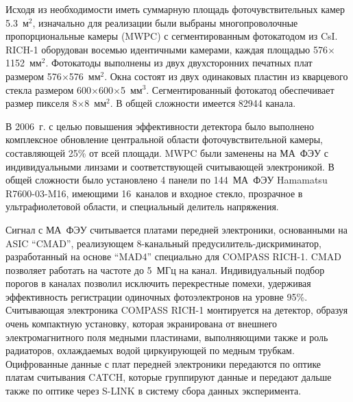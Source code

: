 
Исходя из необходимости иметь суммарную площадь фоточувствительных камер 5.3~м$^2$, изначально для реализации были выбраны многопроволочные пропорциональные камеры (MWPC) с сегментированным фотокатодом из CsI. \mbox{RICH-1} оборудован восемью идентичными камерами, каждая площадью 576$\times$1152~мм$^2$. Фотокатоды выполнены из двух двухсторонних печатных плат размером 576$\times$576~мм$^2$. Окна состоят из двух одинаковых пластин из кварцевого стекла размером 600$\times$600$\times$5~мм$^3$. Сегментированный фотокатод обеспечивает размер пикселя 8$\times$8~мм$^2$. В общей сложности имеется 82944 канала.


В 2006~г. с целью повышения эффективности детектора было выполнено комплексное обновление центральной области фоточувствительной камеры, составляющей 25\% от всей площади. MWPC были заменены на МА~ФЭУ с индивидуальными линзами и соответствующей считывающей электроникой. В общей сложности было установлено 4 панели по 144~МА~ФЭУ Hamamatsu R7600-03-M16, имеющими 16~каналов и входное стекло, прозрачное в ультрафиолетовой области, и специальный делитель напряжения.



Сигнал с МА~ФЭУ считывается платами передней электроники, основанными на ASIC ``CMAD'', реализующем 8-канальный предусилитель-дискриминатор, разработанный на основе ``MAD4'' специально для COMPASS \mbox{RICH-1}. CMAD позволяет работать на частоте до 5~МГц на канал. Индивидуальный подбор порогов в каналах позволил исключить перекрестные помехи, удерживая эффективность регистрации одиночных фотоэлектронов на уровне 95\%. Считывающая электроника COMPASS \mbox{RICH-1} монтируется на детектор, образуя очень компактную установку, которая экранирована от внешнего электромагнитного поля медными пластинами, выполняющими также и роль радиаторов, охлаждаемых водой циркуирующей по медным трубкам. Оцифрованные данные с плат передней электроники передаются по оптике платам считывания CATCH, которые группируют данные и передают дальше также по оптике через S-LINK в систему сбора данных эксперимента.

